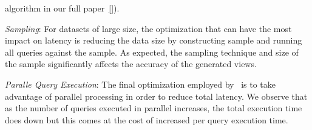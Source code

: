 \begin{denselist}
  algorithm in our full paper~\ref{}).
  \item {\it Sampling}: For datasets of large size, the optimization that can
  have the most impact on latency is reducing the data size by
  constructing sample and running all queries against the sample. As
  expected, the sampling technique and size of the sample significantly affects
  the accuracy of the generated views. 
  \item {\it Paralle Query Execution}: The final optimization employed by
  \SeeDB\ is to take advantage of parallel processing in order to reduce total
  latency. We observe that as the number of queries executed in parallel
  increases, the total execution time does down but this comes at the cost of
  increased per query execution time.
\end{denselist}



